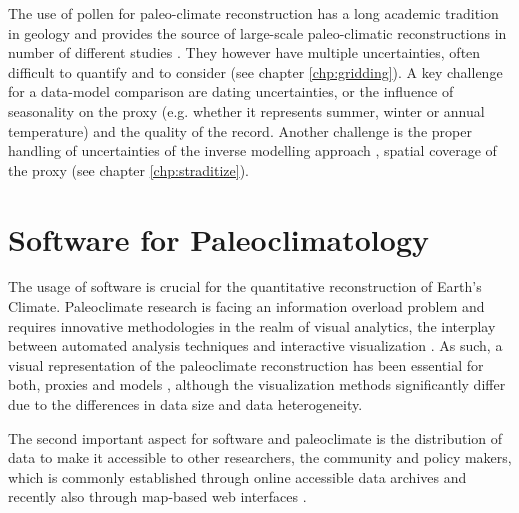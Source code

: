 \begin{refsection}
The use of pollen for paleo-climate reconstruction has a long academic tradition in geology \citep{Bradley1985} and provides the source of large-scale paleo-climatic reconstructions in number of different studies \citep[and more]{MauriDavisCollinsEtAl2015, DavisBrewerStevensonEtAl2003, MarsicekShumanBartleinEtAl2018, FischerJungclaus2011}. They however have multiple uncertainties, often difficult to quantify and to consider (see chapter \ref{chp:gridding}). A key challenge for a data-model comparison are dating uncertainties, or the influence of seasonality on the proxy (e.g. whether it represents summer, winter or annual temperature) and the quality of the record. Another challenge is the proper handling of uncertainties of the inverse modelling approach \citep[e.g.][]{GuiotVernal2011, TelfordBirks2009, TelfordBirks2005}, spatial coverage of the proxy (see chapter \ref{chp:straditize}).


\section{Software for Paleoclimatology} \label{sec:intro-software}

The usage of software is crucial for the quantitative reconstruction of Earth's Climate. Paleoclimate research is facing an information overload problem and requires innovative methodologies in the realm of visual analytics, the interplay between automated analysis techniques and interactive visualization \citep{KeimAndrienkoFeketeEtAl2008, Nocke2014}. As such, a visual representation of the paleoclimate reconstruction has been essential for both, proxies \citep{Nichols1967, Bradley1985, Grimm1988} and models \citep{Phillips1956, RautenhausBoettingerSiemenEtAl2018, NockeSterzelBoettingerEtAl2008, Nocke2014, BoettingerRoeber2019}, although the visualization methods significantly differ due to the differences in data size and data heterogeneity.

The second important aspect for software and paleoclimate is the distribution of data to make it accessible to other researchers, the community and policy makers, which is commonly established through online accessible data archives and recently also through map-based web interfaces \citep{WilliamsGrimmBloisEtAl2018, BollietBrockmannMassonDelmotteEtAl2016}.


\end{refsection}
